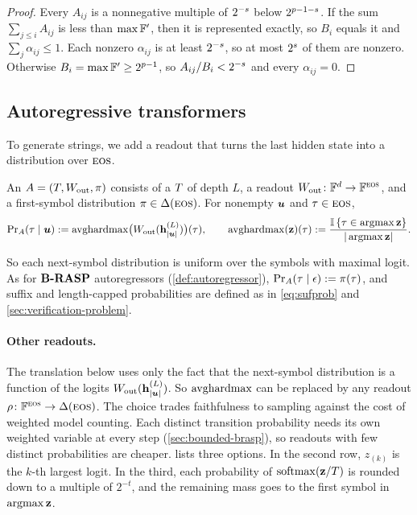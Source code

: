 \begin{proof}
Every $A_{ij}$ is a nonnegative multiple of $2^{-{s}}$ below $2^{{p}-1-{s}}$.
If the sum $\sum_{j\leq i}A_{ij}$ is less than $\max\mathbb{F}'$, then it is represented exactly, so $B_i$ equals it and $\sum_j\alpha_{ij}\leq1$.
Each nonzero $\alpha_{ij}$ is at least $2^{-{s}}$, so at most $2^{{s}}$ of them are nonzero.
Otherwise $B_i=\max\mathbb{F}'\geq2^{{p}-1}$, so $A_{ij}/B_i<2^{-{s}}$ and every $\alpha_{ij}=0$.
\end{proof}

\subsection{Autoregressive transformers}
\label{sec:hardmax_autoregressive}

To generate strings, we add a readout that turns the last hidden state into a distribution over ${{\textsc{eos}}}$.

\begin{definition} \label{def:hardmax_ar}
An  ${A}=({T},W_{\textnormal{out}},\pi)$ consists of a \frtfr{} ${T}$ of depth $L$,
a readout $W_{\textnormal{out}}\colon\mathbb{F}^d\to\mathbb{F}^{{{\textsc{eos}}}}$, and a first-symbol distribution $\pi\in\Delta({{\textsc{eos}}})$. For nonempty ${{\boldsymbol{u}}}$ and $\tau\in{{\textsc{eos}}}$,
\begin{equation}
{\textnormal{Pr}_{{A}}(\tau \mid {{\boldsymbol{u}}})} := \mathrm{avghardmax}\bigl(W_{\textnormal{out}}(\mathbf{h}^{(L)}_{|{{\boldsymbol{u}}}|})\bigr)(\tau),
\qquad
\mathrm{avghardmax}(\mathbf{z})(\tau) := \frac{\mathbb{I} \left\{ \tau\in\operatorname*{{{ argmax}}}\mathbf{z} \right\}}{|\operatorname*{{{ argmax}}}\mathbf{z}|}.
\label{eq:hardmax_symprob}
\end{equation}
\end{definition}
So each next-symbol distribution is uniform over the symbols with maximal logit.
As for ${\textbf{B-RASP}}$ autoregressors (\cref{def:autoregressor}), ${\textnormal{Pr}_{{A}}(\tau \mid \epsilon)}:=\pi(\tau)$,
and suffix and length-capped probabilities are defined as in \cref{eq:sufprob} and \cref{sec:verification-problem}.

\paragraph{Other readouts.}
The translation below uses only the fact that the next-symbol distribution is a function of the logits $W_{\textnormal{out}}(\mathbf{h}^{(L)}_{|{{\boldsymbol{u}}}|})$.
So $\mathrm{avghardmax}$ can be replaced by any readout $\rho\colon\mathbb{F}^{{{\textsc{eos}}}}\to\Delta({{\textsc{eos}}})$.
The choice trades faithfulness to sampling against the cost of weighted model counting.
Each distinct transition probability needs its own weighted variable at every step (\cref{sec:bounded-brasp}),
so readouts with few distinct probabilities are cheaper.  lists three options.
In the second row, $z_{(k)}$ is the $k$-th largest logit. In the third, each probability of ${{ \mathrm{softmax}}}(\mathbf{z}/T)$
is rounded down to a multiple of $2^{-t}$, and the remaining mass goes to the first symbol in $\operatorname*{{{ argmax}}}\mathbf{z}$.

